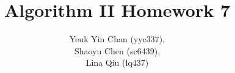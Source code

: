 \documentclass[12pt]{article}
\begin{document}
 
 
\title{Algorithm II Homework 7}
\author{Yeuk Yin Chan (yyc337),\\
Shaoyu Chen (sc6439),\\
Lina Qiu (lq437)}

\maketitle







 
\end{document}
